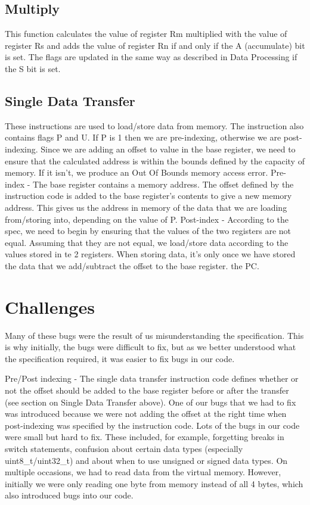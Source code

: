 \documentclass[a4paper]{article}
\begin{document}
\subsection{Multiply}

This function calculates the value of register Rm multiplied with the value of register Rs and adds the value of register Rn if and only if the A (accumulate) bit is set. The flags are updated in the same way as described in Data Processing if the S bit is set.

\subsection{Single Data Transfer}
These instructions are used to load/store data from memory. The instruction also contains flags P and U. If P is 1 then we are pre-indexing, otherwise we are post-indexing. Since we are adding an offset to value in the base register, we need to ensure that the calculated address is within the bounds defined by the capacity of memory. If it isn’t, we produce an Out Of Bounds memory access error.
Pre-index - The base register contains a memory address. The offset defined by the instruction code is added to the base register’s contents to give a new memory address. This gives us the address in memory of the data that we are loading from/storing into, depending on the value of P.
Post-index -  According to the spec, we need to begin by ensuring that the values of the two registers are not equal. Assuming that they are not equal, we load/store data according to the values stored in te 2 registers. When storing data, it’s only once we have stored the data that we add/subtract the offset to the base register.
the PC.

\section{Challenges}
Many of these bugs were the result of us misunderstanding the specification. This is why initially, the bugs were difficult to fix, but as we better understood what the specification required, it was easier to fix bugs in our code.

Pre/Post indexing - The single data transfer instruction code defines whether or not the offset should be added to the base register before or after the transfer (see section on Single Data Transfer above). One of our bugs that we had to fix was introduced because we were not adding the offset at the right time when post-indexing was specified by the instruction code.
Lots of the bugs in our code were small but hard to fix. These included, for example, forgetting breaks in switch statements, confusion about certain data types (especially uint8\_t/uint32\_t) and about when to use unsigned or signed data types.
On multiple occasions, we had to read data from the virtual memory. However, initially we were only reading one byte from memory instead of all 4 bytes, which also introduced bugs into our code.
\end{document}
